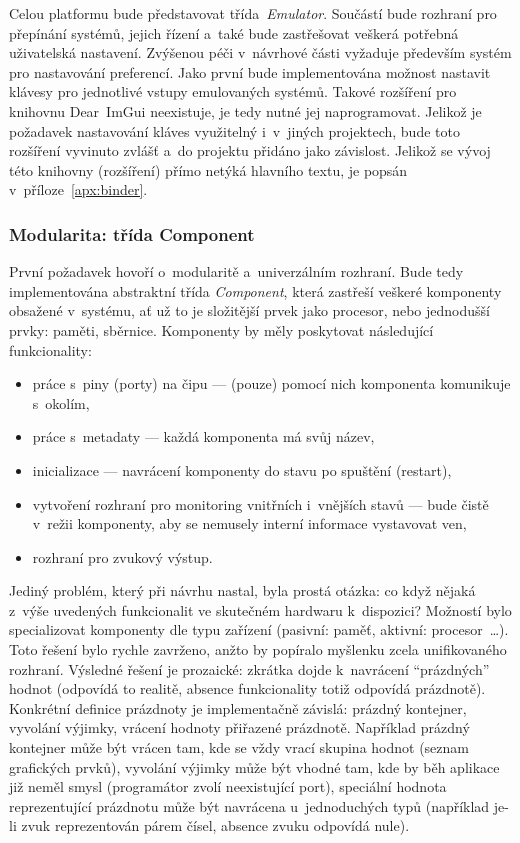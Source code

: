 Celou platformu bude představovat třída~\emph{Emulator}. Součástí bude rozhraní pro přepínání systémů, jejich řízení a~také bude zastřešovat veškerá potřebná uživatelská nastavení. Zvýšenou péči v~návrhové části vyžaduje především systém pro nastavování preferencí. Jako první bude implementována možnost nastavit klávesy pro jednotlivé vstupy emulovaných systémů. Takové rozšíření pro knihovnu Dear~ImGui neexistuje, je tedy nutné jej naprogramovat. Jelikož je požadavek nastavování kláves využitelný i~v~jiných projektech, bude toto rozšíření vyvinuto zvlášť a~do projektu přidáno jako závislost. Jelikož se vývoj této knihovny (rozšíření) přímo netýká hlavního textu, je popsán v~příloze~\ref{apx:binder}.

\subsubsection{Modularita: třída Component}
První požadavek hovoří o~modularitě a~univerzálním rozhraní. Bude tedy implementována abstraktní třída \emph{Component}, která zastřeší veškeré komponenty obsažené v~systému, ať už to je složitější prvek jako procesor, nebo jednodušší prvky: paměti, sběrnice. Komponenty by měly poskytovat následující funkcionality:
\begin{itemize}
	\item práce s~piny (porty) na čipu --- (pouze) pomocí nich komponenta komunikuje s~okolím,
	\item práce s~metadaty --- každá komponenta má svůj název,
	\item inicializace --- navrácení komponenty do stavu po spuštění (restart),
	\item vytvoření rozhraní pro monitoring vnitřních i~vnějších stavů --- bude čistě v~režii komponenty, aby se nemusely interní informace vystavovat ven,
	\item rozhraní pro zvukový výstup.
\end{itemize}

Jediný problém, který při návrhu nastal, byla prostá otázka: co když nějaká z~výše uvedených funkcionalit ve skutečném hardwaru k~dispozici? Možností bylo specializovat komponenty dle typu zařízení (pasivní: paměť, aktivní: procesor~\dots). Toto řešení bylo rychle zavrženo, anžto by popíralo myšlenku zcela unifikovaného rozhraní. Výsledné řešení je prozaické: zkrátka dojde k~navrácení \enquote{prázdných} hodnot (odpovídá to realitě, absence funkcionality totiž odpovídá prázdnotě). Konkrétní definice prázdnoty je implementačně závislá: prázdný kontejner, vyvolání výjimky, vrácení hodnoty přiřazené prázdnotě. Například prázdný kontejner může být vrácen tam, kde se vždy vrací skupina hodnot (seznam grafických prvků), vyvolání výjimky může být vhodné tam, kde by běh aplikace již neměl smysl (programátor zvolí neexistující port), speciální hodnota reprezentující prázdnotu může být navrácena u~jednoduchých typů (například je-li zvuk reprezentován párem čísel, absence zvuku odpovídá nule).

